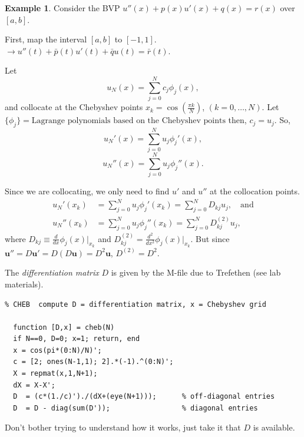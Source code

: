 \documentclass[12pt, a4paper]{article}
\renewcommand{\vec}[1]{\mathbf{#1}}
\theoremstyle{definition}
\newtheorem{example}[thm]{Example}
\theoremstyle{remark}
\numberwithin{equation}{section}
\begin{document}
\begin{example}
Consider the BVP $u''(x)+p(x)u'(x)+q(x)=r(x)$ over $[a,b]$.

First, map the interval $[a,b]$ to $[-1,1]$. $\to u''(t) +\bar{p}(t)u'(t)+\bar{q}u(t)=\bar{r}(t)$.

Let
\begin{equation*}
u_N(x) = \sum_{j=0}^{N}c_j\phi_j(x),
\end{equation*}
and collocate at the Chebyshev points $x_k=\cos(\frac{\pi k}{N})$, $(k=0,\dots,N)$.
Let $\{ \phi_j \} = \mbox{Lagrange polynomials based on the Chebyshev points}$  then, $c_j = u_j$. 
So,
\begin{equation*}
u_N'(x) = \sum_{j=0}^N u_j\phi_j'(x),
\end{equation*}
\begin{equation*}
u_N''(x)  = \sum_{j=0}^{N}u_j\phi_j''(x).
\end{equation*}


Since we are collocating, we only need to find $u'$ and $u''$ at the collocation points.
\begin{align*}
u_N'(x_k) &= \sum_{j=0}^N u_j \phi_j'(x_k) = \sum_{j=0}^N D_{kj}u_j, \quad \text{and} \\
u_N''(x_k) &= \sum_{j=0}^N u_j \phi_j''(x_k) = \sum_{j=0}^N D^{(2)}_{kj}u_j,
\end{align*}
where $D_{kj} \equiv \frac{d}{dx}\phi_j(x)\bigg|_{x_k}$ and $D_{kj}^{(2)}=\frac{d^2}{dx^2}\phi_j(x)\bigg|_{x_k}$.
But since $\vec{u}''=D\vec{u}'=D(D\vec{u})=D^2\vec{u}$, $D^{(2)}=D^2$.

\newpage
The \emph{differentiation matrix} $D$ is given by  the M-file  due to Trefethen (see lab materials).

\begin{lstlisting}
% CHEB  compute D = differentiation matrix, x = Chebyshev grid

  function [D,x] = cheb(N)
  if N==0, D=0; x=1; return, end
  x = cos(pi*(0:N)/N)'; 
  c = [2; ones(N-1,1); 2].*(-1).^(0:N)';
  X = repmat(x,1,N+1);
  dX = X-X';                  
  D  = (c*(1./c)')./(dX+(eye(N+1)));      % off-diagonal entries
  D  = D - diag(sum(D'));                 % diagonal entries
\end{lstlisting}

Don't bother trying to understand how it works, just take it that $D$ is available.


\end{example}
\end{document}
